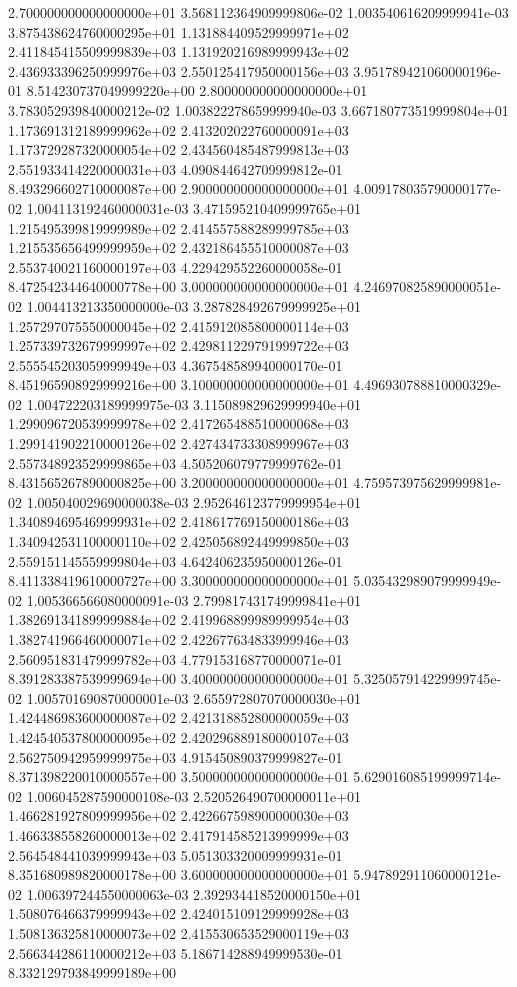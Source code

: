 \documentclass{article}
\begin{document}
\begin{center}
{2.700000000000000000e+01 3.568112364909999806e-02 1.003540616209999941e-03 3.875438624760000295e+01 1.131884409529999971e+02 2.411845415509999839e+03 1.131920216989999943e+02 2.436933396250999976e+03 2.550125417950000156e+03 3.951789421060000196e-01 8.514230737049999220e+00
2.800000000000000000e+01 3.783052939840000212e-02 1.003822278659999940e-03 3.667180773519999804e+01 1.173691312189999962e+02 2.413202022760000091e+03 1.173729287320000054e+02 2.434560485487999813e+03 2.551933414220000031e+03 4.090844642709999812e-01 8.493296602710000087e+00
2.900000000000000000e+01 4.009178035790000177e-02 1.004113192460000031e-03 3.471595210409999765e+01 1.215495399819999989e+02 2.414557588289999785e+03 1.215535656499999959e+02 2.432186455510000087e+03 2.553740021160000197e+03 4.229429552260000058e-01 8.472542344640000778e+00
3.000000000000000000e+01 4.246970825890000051e-02 1.004413213350000000e-03 3.287828492679999925e+01 1.257297075550000045e+02 2.415912085800000114e+03 1.257339732679999997e+02 2.429811229791999722e+03 2.555545203059999949e+03 4.367548589940000170e-01 8.451965908929999216e+00
3.100000000000000000e+01 4.496930788810000329e-02 1.004722203189999975e-03 3.115089829629999940e+01 1.299096720539999978e+02 2.417265488510000068e+03 1.299141902210000126e+02 2.427434733308999967e+03 2.557348923529999865e+03 4.505206079779999762e-01 8.431565267890000825e+00
3.200000000000000000e+01 4.759573975629999981e-02 1.005040029690000038e-03 2.952646123779999954e+01 1.340894695469999931e+02 2.418617769150000186e+03 1.340942531100000110e+02 2.425056892449999850e+03 2.559151145559999804e+03 4.642406235950000126e-01 8.411338419610000727e+00
3.300000000000000000e+01 5.035432989079999949e-02 1.005366566080000091e-03 2.799817431749999841e+01 1.382691341899999884e+02 2.419968899989999954e+03 1.382741966460000071e+02 2.422677634833999946e+03 2.560951831479999782e+03 4.779153168770000071e-01 8.391283387539999694e+00
3.400000000000000000e+01 5.325057914229999745e-02 1.005701690870000001e-03 2.655972807070000030e+01 1.424486983600000087e+02 2.421318852800000059e+03 1.424540537800000095e+02 2.420296889180000107e+03 2.562750942959999975e+03 4.915450890379999827e-01 8.371398220010000557e+00
3.500000000000000000e+01 5.629016085199999714e-02 1.006045287590000108e-03 2.520526490700000011e+01 1.466281927809999956e+02 2.422667598900000030e+03 1.466338558260000013e+02 2.417914585213999999e+03 2.564548441039999943e+03 5.051303320009999931e-01 8.351680989820000178e+00
3.600000000000000000e+01 5.947892911060000121e-02 1.006397244550000063e-03 2.392934418520000150e+01 1.508076466379999943e+02 2.424015109129999928e+03 1.508136325810000073e+02 2.415530653529000119e+03 2.566344286110000212e+03 5.186714288949999530e-01 8.332129793849999189e+00
}
\end{center}
\end{document}

